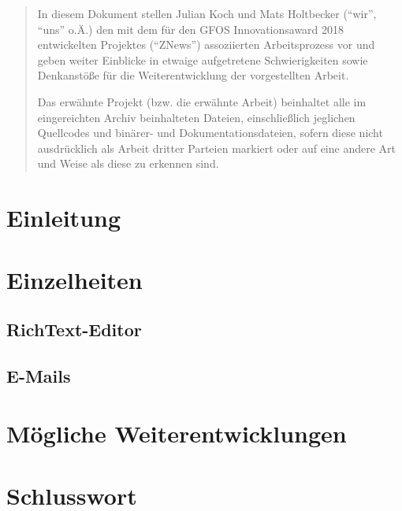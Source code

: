 

\newcommand*{\thetitle}{ZNews\\ Dokumentation}

\Begin

\begin{abstract}
    In diesem Dokument stellen Julian Koch und Mats Holtbecker
    (``wir'', ``uns'' o.Ä.)
    den mit dem für den GFOS Innovationsaward 2018 entwickelten Projektes (``ZNews'')
    assoziierten Arbeitsprozess vor
    und geben weiter Einblicke in etwaige aufgetretene Schwierigkeiten
    sowie Denkanstöße für die Weiterentwicklung der vorgestellten Arbeit.

    Das erwähnte Projekt (bzw. die erwähnte Arbeit)
    beinhaltet alle im eingereichten Archiv beinhalteten Dateien,
    einschließlich jeglichen Quellcodes und binärer- und Dokumentationsdateien,
    sofern diese nicht ausdrücklich als Arbeit dritter Parteien markiert
    oder auf eine andere Art und Weise als diese zu erkennen sind.
\end{abstract}

\newpage

\section{Einleitung}


\section{Einzelheiten}

\subsection{RichText-Editor}


\subsection{E-Mails}


\section{Mögliche Weiterentwicklungen}


\section{Schlusswort}


\End
